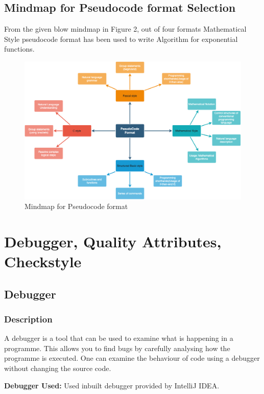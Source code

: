 \documentclass[a4paper,12pt]{report}
\begin{document}
\subsection{Mindmap for Pseudocode format Selection}
From the given blow mindmap in Figure 2, out of four formats Mathematical Style pseudocode format has been used to write Algorithm for exponential functions.\cite{b14}

\begin{figure}[h]
\includegraphics[width=15cm]{Mindmap.png}
\caption{Mindmap for Pseudocode format}
\label{exp}
\end{figure}
\pagebreak

\section{Debugger, Quality Attributes, Checkstyle}
\subsection{Debugger}
\subsubsection{Description}A debugger is a tool that can be used to examine what is happening in a programme. This allows you to find bugs by carefully analysing how the programme is executed. One can examine the behaviour of code using a debugger without changing the source code.

\textbf{Debugger Used:} Used inbuilt debugger provided by IntelliJ IDEA.
\end{document}
